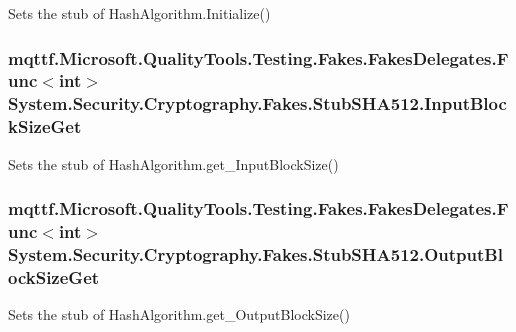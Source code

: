 Sets the stub of Hash\-Algorithm.\-Initialize()

\hypertarget{class_system_1_1_security_1_1_cryptography_1_1_fakes_1_1_stub_s_h_a512_ae5e3b8ef11db2880d6768a7d6ccd6533}{
\subsubsection[{Input\-Block\-Size\-Get}]{\setlength{\rightskip}{0pt plus 5cm}mqttf.\-Microsoft.\-Quality\-Tools.\-Testing.\-Fakes.\-Fakes\-Delegates.\-Func$<$int$>$ System.\-Security.\-Cryptography.\-Fakes.\-Stub\-S\-H\-A512.\-Input\-Block\-Size\-Get}}\label{class_system_1_1_security_1_1_cryptography_1_1_fakes_1_1_stub_s_h_a512_ae5e3b8ef11db2880d6768a7d6ccd6533}


Sets the stub of Hash\-Algorithm.\-get\-\_\-\-Input\-Block\-Size()

\hypertarget{class_system_1_1_security_1_1_cryptography_1_1_fakes_1_1_stub_s_h_a512_a34ef78afd2a7369c2fc81b0f60c78a82}{
\subsubsection[{Output\-Block\-Size\-Get}]{\setlength{\rightskip}{0pt plus 5cm}mqttf.\-Microsoft.\-Quality\-Tools.\-Testing.\-Fakes.\-Fakes\-Delegates.\-Func$<$int$>$ System.\-Security.\-Cryptography.\-Fakes.\-Stub\-S\-H\-A512.\-Output\-Block\-Size\-Get}}\label{class_system_1_1_security_1_1_cryptography_1_1_fakes_1_1_stub_s_h_a512_a34ef78afd2a7369c2fc81b0f60c78a82}


Sets the stub of Hash\-Algorithm.\-get\-\_\-\-Output\-Block\-Size()




